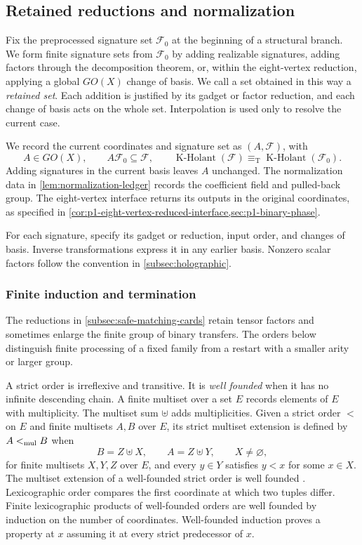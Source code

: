 \documentclass[11pt,letterpaper,onecolumn]{article}
\theoremstyle{plain}
\theoremstyle{definition}
\theoremstyle{remark}
\newcommand{\cF}{\mathcal F}
\newcommand{\KHolant}{\operatorname{K\text{-}Holant}}
\newcommand{\equivT}{\equiv_{\mathrm T}}
\begin{document}
\subsection{Retained reductions and normalization}
\label{sec:retained-normalization}

Fix the preprocessed signature set \(\cF_0\) at the beginning of a
structural branch.  We form finite signature sets from \(\cF_0\) by
adding realizable signatures, adding factors through the decomposition
theorem, or, within the eight-vertex reduction, applying a global \(GO(X)\)
change of basis.  We call a set obtained in this way a \emph{retained set}.
Each addition is justified by its gadget or factor reduction, and each
change of basis acts on the whole set. Interpolation is used only to
resolve the current case.

We record the current coordinates and signature set as \((A,\cF)\), with
\[
 A\in GO(X),\qquad A\cF_0\subseteq\cF,
 \qquad \KHolant(\cF)\equivT\KHolant(\cF_0).
\]
Adding signatures in the current basis leaves \(A\) unchanged.
The normalization data in \cref{lem:normalization-ledger} records the
coefficient field and pulled-back group. The eight-vertex interface
returns its outputs in the original coordinates, as specified in
\cref{cor:p1-eight-vertex-reduced-interface,sec:p1-binary-phase}.

For each signature, specify its gadget or reduction, input order, and
changes of basis.  Inverse transformations express it in any earlier basis.
Nonzero scalar factors follow the convention in \cref{subsec:holographic}.

\subsubsection{Finite induction and termination}
\label{subsec:worklist-termination}

The reductions in \cref{subsec:safe-matching-cards} retain tensor factors
and sometimes enlarge the finite group of binary transfers.  The orders
below distinguish finite processing of a fixed family from a restart with
a smaller arity or larger group.

\label{subsubsec:worklist-termination}

A strict order is irreflexive and transitive.  It is \emph{well founded}
when it has no infinite descending chain.  A finite multiset over a set
\(E\) records elements of \(E\) with multiplicity. The multiset sum \(\uplus\) adds multiplicities.  Given a strict order \(<\) on \(E\) and finite multisets \(A,B\) over
\(E\), its strict multiset extension is defined by \(A<_{\rm mul}B\) when
\[
 B=Z\uplus X,\qquad
 A=Z\uplus Y,\qquad X\ne\varnothing,
\]
for finite multisets \(X,Y,Z\) over \(E\), and every \(y\in Y\) satisfies
\(y<x\) for some \(x\in X\).  The multiset
extension of a well-founded strict order is well founded
\cite{DershowitzManna1979}.  Lexicographic order compares the first
coordinate at which two tuples differ. Finite lexicographic products of
well-founded orders are well founded by induction on the number of
coordinates.  Well-founded induction proves a property at \(x\) assuming it
at every strict predecessor of \(x\).
\end{document}
